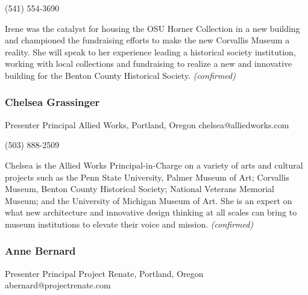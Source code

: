 \documentclass{report}
\begin{document}
                (541) 554-3690\newline

                Irene was the catalyst for housing the OSU Horner Collection in a new building and championed the fundraising efforts to make the new Corvallis Museum a reality. She will speak to her experience leading a historical society institution, working with local collections and fundraising to realize a new and innovative building for the Benton County Historical Society.
                \emph{ (confirmed) }
              

              
                \subsubsection*{ Chelsea Grassinger }
                Presenter\newline
                Principal\newline
                Allied Works, Portland, Oregon
                \newline
                chelsea@alliedworks.com\newline
                
                (503) 888-2509\newline

                Chelsea is the Allied Works Principal-in-Charge on a variety of arts and cultural projects such as the Penn State University, Palmer Museum of Art; Corvallis Museum, Benton County Historical Society; National Veterans Memorial Museum; and the University of Michigan Museum of Art. She is an expert on what new architecture and innovative design thinking at all scales can bring to museum institutions to elevate their voice and mission.
                \emph{ (confirmed) }
              

              
                \subsubsection*{ Anne Bernard }
                Presenter\newline
                Principal\newline
                Project Renate, Portland, Oregon
                \newline
                abernard@projectrenate.com\newline
                
\end{document}
